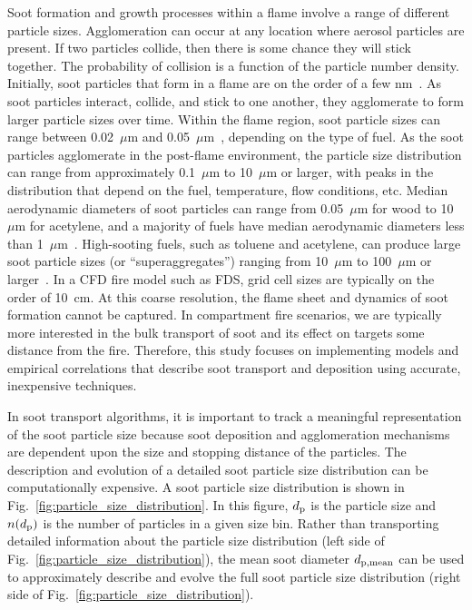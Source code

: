 Soot formation and growth processes within a flame involve a range of different particle sizes. Agglomeration can occur at any location where aerosol particles are present. If two particles collide, then there is some chance they will stick together. The probability of collision is a function of the particle number density. Initially, soot particles that form in a flame are on the order of a few nm~\cite{kennedy1997models}. As soot particles interact, collide, and stick to one another, they agglomerate to form larger particle sizes over time. Within the flame region, soot particle sizes can range between 0.02~$\mu$m and 0.05~$\mu$m~\cite{Butler:2004p433}, depending on the type of fuel. As the soot particles agglomerate in the post-flame environment, the particle size distribution can range from approximately 0.1~$\mu$m to 10~$\mu$m or larger, with peaks in the distribution that depend on the fuel, temperature, flow conditions, etc. Median aerodynamic diameters of soot particles can range from 0.05~$\mu$m for wood to 10~$\mu$m for acetylene, and a majority of fuels have median aerodynamic diameters less than 1~$\mu$m~\cite{Butler:2004p433}. High-sooting fuels, such as toluene and acetylene, can produce large soot particle sizes (or ``superaggregates'') ranging from 10~$\mu$m to 100~$\mu$m or larger~\cite{PhysRevLett.80.1782,doi:10.1021/la034063h,Kearney20123191}. In a CFD fire model such as FDS, grid cell sizes are typically on the order of 10~cm. At this coarse resolution, the flame sheet and dynamics of soot formation cannot be captured. In compartment fire scenarios, we are typically more interested in the bulk transport of soot and its effect on targets some distance from the fire. Therefore, this study focuses on implementing models and empirical correlations that describe soot transport and deposition using accurate, inexpensive techniques.

In soot transport algorithms, it is important to track a meaningful representation of the soot particle size because soot deposition and agglomeration mechanisms are dependent upon the size and stopping distance of the particles. The description and evolution of a detailed soot particle size distribution can be computationally expensive. A soot particle size distribution is shown in Fig.~\ref{fig:particle_size_distribution}. In this figure, $d\sb{p}$ is the particle size and $n(d\sb{p})$ is the number of particles in a given size bin. Rather than transporting detailed information about the particle size distribution (left side of Fig.~\ref{fig:particle_size_distribution}), the mean soot diameter $d\sb{p, mean}$ can be used to approximately describe and evolve the full soot particle size distribution (right side of Fig.~\ref{fig:particle_size_distribution}).

